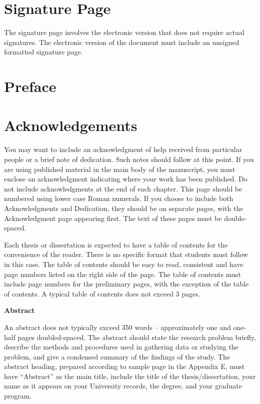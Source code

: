 \documentclass[
  11pt,
]{article}
\begin{document}
\section*{Signature Page}

The signature page involves the electronic version that does not require
actual signatures. The electronic version of the document must include
an unsigned formatted signature page.  \newpage

\section*{Preface}

\newpage

\section*{Acknowledgements}

You may want to include an acknowledgment of help received from
particular people or a brief note of dedication. Such notes should
follow at this point. If you are using published material in the main
body of the manuscript, you must enclose an acknowledgment indicating
where your work has been published. Do not include acknowledgments at
the end of each chapter. This page should be numbered using lower case
Roman numerals. If you choose to include both Acknowledgments and
Dedication, they should be on separate pages, with the Acknowledgment
page appearing first. The text of these pages must be double-spaced.

\centering
\raggedright
\newpage
\tableofcontents

Each thesis or dissertation is expected to have a table of contents for
the convenience of the reader. There is no specific format that students
must follow in this case. The table of contents should be easy to read,
consistent and have page numbers listed on the right side of the page.
The table of contents must include page numbers for the preliminary
pages, with the exception of the table of contents. A typical table of
contents does not exceed 3 pages. \newpage

\begin{centering}
{\bf Abstract}
\end{centering}

An abstract does not typically exceed 350 words -- approximately one and
one-half pages doubled-spaced. The abstract should state the research
problem briefly, describe the methods and procedures used in gathering
data or studying the problem, and give a condensed summary of the
findings of the study. The abstract heading, prepared according to
sample page in the Appendix E, must have ``Abstract'' as the main title,
include the title of the thesis/dissertation, your name as it appears on
your University records, the degree, and your graduate program. \newpage
\end{document}
